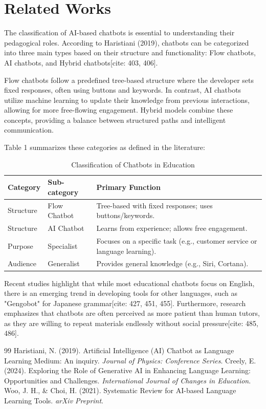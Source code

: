 \documentclass{article}
\begin{document}
\section{Related Works}

The classification of AI-based chatbots is essential to understanding their pedagogical roles. According to Haristiani (2019), chatbots can be categorized into three main types based on their structure and functionality: Flow chatbots, AI chatbots, and Hybrid chatbots[cite: 403, 406]. 

Flow chatbots follow a predefined tree-based structure where the developer sets fixed responses, often using buttons and keywords. In contrast, AI chatbots utilize machine learning to update their knowledge from previous interactions, allowing for more free-flowing engagement. Hybrid models combine these concepts, providing a balance between structured paths and intelligent communication.

Table 1 summarizes these categories as defined in the literature:

\begin{table}[h!]
\centering
\caption{Classification of Chatbots in Education}
\begin{tabular}{|l|l|p{6cm}|}
\hline
\textbf{Category} & \textbf{Sub-category} & \textbf{Primary Function} \\ \hline
Structure & Flow Chatbot & Tree-based with fixed responses; uses buttons/keywords. \\ \hline
Structure & AI Chatbot & Learns from experience; allows free engagement. \\ \hline
Purpose & Specialist & Focuses on a specific task (e.g., customer service or language learning). \\ \hline
Audience & Generalist & Provides general knowledge (e.g., Siri, Cortana). \\ \hline
\end{tabular}
\end{table}

Recent studies highlight that while most educational chatbots focus on English, there is an emerging trend in developing tools for other languages, such as "Gengobot" for Japanese grammar[cite: 427, 451, 455]. Furthermore, research emphasizes that chatbots are often perceived as more patient than human tutors, as they are willing to repeat materials endlessly without social pressure[cite: 485, 486].

\begin{thebibliography}{99}
 Haristiani, N. (2019). Artificial Intelligence (AI) Chatbot as Language Learning Medium: An inquiry. \textit{Journal of Physics: Conference Series}.
 Creely, E. (2024). Exploring the Role of Generative AI in Enhancing Language Learning: Opportunities and Challenges. \textit{International Journal of Changes in Education}.
 Woo, J. H., \& Choi, H. (2021). Systematic Review for AI-based Language Learning Tools. \textit{arXiv Preprint}.
\end{thebibliography}
\end{document}
